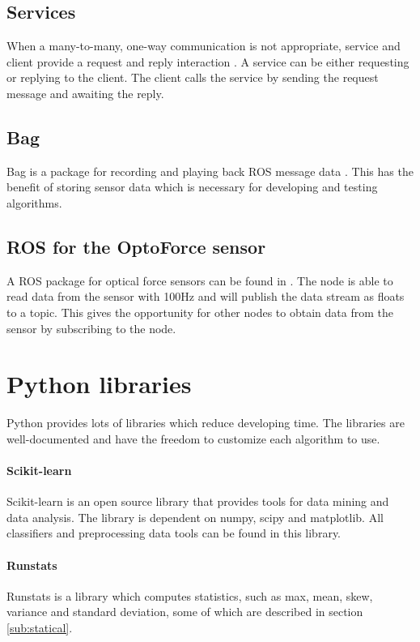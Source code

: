 \documentclass[USenglish]{ifimaster}  %
\begin{document}
\subsection{Services}\label{sub:service}
When a many-to-many, one-way communication is not appropriate, service and client provide a request and reply interaction \cite{ROSconcept}. A service can be either requesting or replying to the client. The client calls the service by sending the request message and awaiting the reply.


\subsection{Bag}
Bag is a package for recording and playing back ROS message data \cite{ROSconcept}. This has the benefit of storing sensor data which is necessary for developing and testing algorithms.


\subsection{ROS for the OptoForce sensor}  
A ROS package for optical force sensors can be found in \cite{optoRos}. The node is able to read data from the sensor with 100Hz and will publish the data stream as floats to a topic. This gives the opportunity for other nodes to obtain data from the sensor by subscribing to the node.


\section{Python libraries}
Python provides lots of libraries which reduce developing time. The libraries are well-documented and have the freedom to customize each algorithm to use.

\paragraph{Scikit-learn} \label{para:scikit}
Scikit-learn \cite{scikit-learn} is an open source library that provides tools for data mining and data analysis. The library is dependent on numpy, scipy and matplotlib. All classifiers and preprocessing data tools can be found in this library. 

\paragraph{Runstats}
Runstats \cite{runstats} is a library which computes statistics, such as max, mean, skew, variance and standard deviation, some of which are described in section \ref{sub:statical}.
\end{document}
